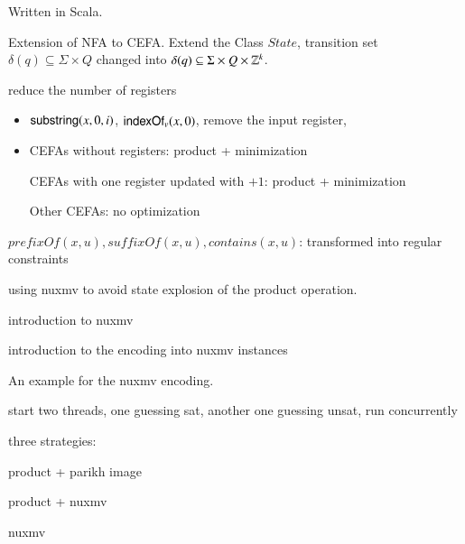 

Written in Scala.

Extension of NFA to CEFA. Extend the Class $State$, transition set $\delta(q) \subseteq  \Sigma \times Q$ changed into  $\delta(q) \subseteq \Sigma \times Q \times \mathbb{Z}^k$. 

reduce the number of registers
\begin{itemize}
\item $\mathsf{substring}(x, 0, i)$, $\mathsf{indexOf}_v(x, 0)$, remove the input register,
%
\item CEFAs without registers: product + minimization 

CEFAs with one register updated with $+1$: product + minimization

Other CEFAs: no optimization
\end{itemize}

$prefixOf(x, u), suffixOf(x,u), contains(x, u)$: transformed into regular constraints

using nuxmv to avoid state explosion of the product operation.

introduction to nuxmv

introduction to the encoding into nuxmv instances

\begin{example}
An example for the nuxmv encoding.
\end{example}

start two threads, one guessing sat, another one guessing unsat, run concurrently

three strategies: 

product + parikh image

product + nuxmv

nuxmv


